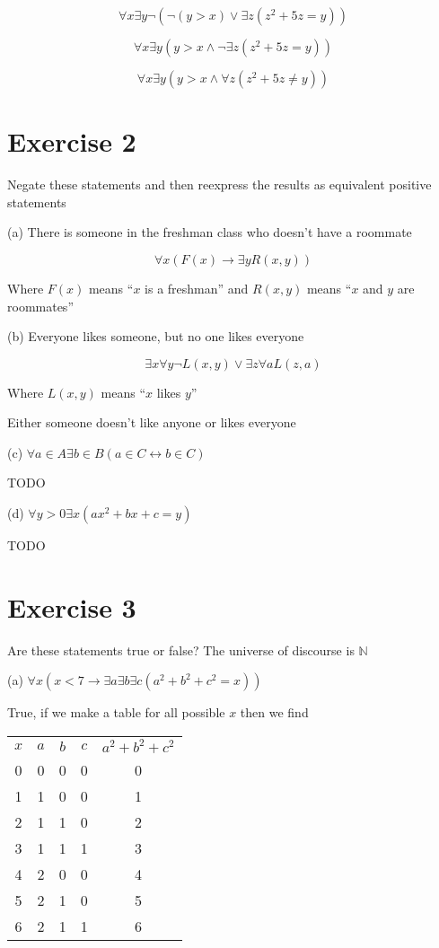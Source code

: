 \documentclass[11pt]{article}
\newcommand{\then}{\rightarrow}
\newcommand{\bicond}{\leftrightarrow}
\begin{document}
$$\forall x \exists y \neg (\neg (y > x) \vee \exists z (z^2 + 5z = y))$$

$$\forall x \exists y (y > x \wedge \neg \exists z (z^2 + 5z = y))$$

$$\forall x \exists y (y > x \wedge \forall z (z^2 + 5z \neq y))$$

\section*{Exercise 2}

Negate these statements and then reexpress the results as equivalent positive 
statements

\noindent (a) There is someone in the freshman class who doesn't have a roommate

$$\forall x (F(x) \then \exists y R(x,y))$$

Where $F(x)$ means ``$x$ is a freshman'' and $R(x,y)$ means ``$x$ and $y$ are 
roommates''

\noindent (b) Everyone likes someone, but no one likes everyone

$$\exists x \forall y \neg L(x, y) \vee \exists z \forall a L(z, a)$$

Where $L(x,y)$ means ``$x$ likes $y$''

Either someone doesn't like anyone or likes everyone

\noindent (c) $\forall a \in A \exists b \in B (a \in C \bicond b \in C)$

TODO

\noindent(d) $\forall y > 0 \exists x (ax^2 + bx + c = y)$

TODO

\section*{Exercise 3}

Are these statements true or false? The universe of discourse is $\mathbb{N}$

\noindent (a) $\forall x (x < 7 \then \exists a \exists b \exists c (a^2 + b^2 + c^2 = x))$

True, if we make a table for all possible $x$ then we find 

\begin{center}
    \begin{tabular}{ c c c c c }
    $x$ & $a$ & $b$ & $c$ & $a^2 + b^2 + c^2$ \\ 
    0 & 0 & 0 & 0 & 0\\  
    1 & 1 & 0 & 0 & 1\\
    2 & 1 & 1 & 0 & 2\\  
    3 & 1 & 1 & 1 & 3\\
    4 & 2 & 0 & 0 & 4\\
    5 & 2 & 1 & 0 & 5\\
    6 & 2 & 1 & 1 & 6
    \end{tabular}
\end{center}
\end{document}
